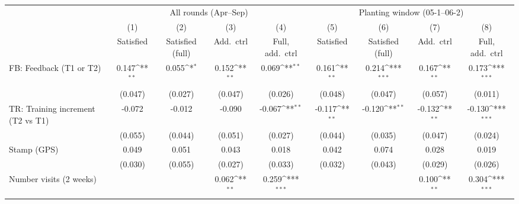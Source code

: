 {
\def\sym#1{\ifmmode^{#1}\else\(^{#1}\)\fi}
\begin{tabular}{l*{8}{c}}
\toprule
                    &\multicolumn{4}{c}{All rounds (Apr--Sep)}                                              &\multicolumn{4}{c}{Planting window (05-1--06-2)}                                       \\\cmidrule(lr){2-5}\cmidrule(lr){6-9}
                    &\multicolumn{1}{c}{(1)}&\multicolumn{1}{c}{(2)}&\multicolumn{1}{c}{(3)}&\multicolumn{1}{c}{(4)}&\multicolumn{1}{c}{(5)}&\multicolumn{1}{c}{(6)}&\multicolumn{1}{c}{(7)}&\multicolumn{1}{c}{(8)}\\
                    &\multicolumn{1}{c}{Satisfied}&\multicolumn{1}{c}{Satisfied (full)}&\multicolumn{1}{c}{Add.\ ctrl}&\multicolumn{1}{c}{Full, add.\ ctrl}&\multicolumn{1}{c}{Satisfied}&\multicolumn{1}{c}{Satisfied (full)}&\multicolumn{1}{c}{Add.\ ctrl}&\multicolumn{1}{c}{Full, add.\ ctrl}\\
\midrule
FB: Feedback (T1 or T2)&       0.147\sym{**} &       0.055\sym{*}  &       0.152\sym{**} &       0.069\sym{**} &       0.161\sym{**} &       0.214\sym{***}&       0.167\sym{**} &       0.173\sym{***}\\
                    &     (0.047)         &     (0.027)         &     (0.047)         &     (0.026)         &     (0.048)         &     (0.047)         &     (0.057)         &     (0.011)         \\
TR: Training increment (T2 vs T1)&      -0.072         &      -0.012         &      -0.090         &      -0.067\sym{**} &      -0.117\sym{**} &      -0.120\sym{**} &      -0.132\sym{**} &      -0.130\sym{***}\\
                    &     (0.055)         &     (0.044)         &     (0.051)         &     (0.027)         &     (0.044)         &     (0.035)         &     (0.047)         &     (0.024)         \\
Stamp (GPS)         &       0.049         &       0.051         &       0.043         &       0.018         &       0.042         &       0.074         &       0.028         &       0.019         \\
                    &     (0.030)         &     (0.055)         &     (0.027)         &     (0.033)         &     (0.032)         &     (0.043)         &     (0.029)         &     (0.026)         \\
Number visits (2 weeks)&                     &                     &       0.062\sym{**} &       0.259\sym{***}&                     &                     &       0.100\sym{**} &       0.304\sym{***}\\

\end{tabular}}
